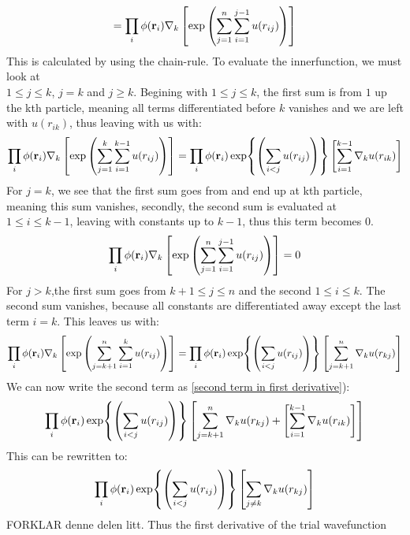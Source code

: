 \documentclass[a4paper, 10pt]{article}
\begin{document}
\begin{appendices}
\begin{align}
  = \prod_{i}\phi(\bold{r}_{i})\nabla_{k}\left[\exp\left(\sum_{j = 1}^{n}\sum_{i = 1}^{j-1}u(r_{ij})\right)\right]
  \label{second term in first derivative}
\end{align}
This is calculated by using the chain-rule. To evaluate the innerfunction, we must look
at \\$1 \le j \le k$, $j = k$ and $j \ge k$. Begining with $1\le  j \le k$,
the first sum is from $1$ up the kth particle, meaning all terms differentiated before $k$ vanishes
and we are left with $u(r_{ik})$, thus leaving with us with:
\begin{align}
  \prod_{i}\phi(\bold{r}_{i})\nabla_{k}\left[\exp\left(\sum_{j = 1}^{k}\sum_{i = 1}^{k-1}u(r_{ij})\right)\right]
  =
  \prod_{i}\phi(\bold{r}_{i})\exp{\left(\sum_{i<j}u(r_{ij})\right)}
  \left[\sum_{i = 1}^{k-1}\nabla_{k}u(r_{ik})\right]
\end{align}
For $j = k$, we see that the first sum goes from and end up at kth particle, meaning
this sum vanishes, secondly, the second sum is evaluated at $1 \le i \le k-1$, leaving with
constants up to $k-1$, thus this term becomes $0$.
\begin{align}
\prod_{i}\phi(\bold{r}_{i})\nabla_{k}\left[\exp\left(\sum_{j = 1}^{n}\sum_{i = 1}^{j-1}u(r_{ij})\right)\right]
= 0
\end{align}
For $j > k$,the first sum goes from $k+1\le j \le n$ and the second $1 \le i \le k$.  The second sum vanishes, because all constants are differentiated away
except the last term $i = k$. This leaves us with:
\begin{align}
  \prod_{i}\phi(\bold{r}_{i})\nabla_{k}\left[\exp\left(\sum_{j = k+1}^{n}\sum_{i = 1}^{k}u(r_{ij})\right)\right]
  = \prod_{i}\phi(\bold{r}_{i})
  \exp{\left(\sum_{i<j}u(r_{ij})\right)}
  \left[\sum_{j = k + 1}^{n}\nabla_{k}u(r_{kj})\right]
\end{align}
We can now write the second term as \ref{second term in first derivative}):
\begin{align}\label{combined sum}
\prod_{i}\phi(\bold{r}_{i})
  \exp{\left(\sum_{i<j}u(r_{ij})\right)}
  \left[\sum_{j = k + 1}^{n}\nabla_{k}u(r_{kj}) +
  \left[\sum_{i = 1}^{k-1}\nabla_{k}u(r_{ik})\right]\right]
\end{align}
This can be rewritten to:
  \begin{align}
  \prod_{i}\phi(\bold{r}_{i})
    \exp{\left(\sum_{i<j}u(r_{ij})\right)}
    \left[\sum_{j \neq k}\nabla_{k}u(r_{kj})\right]
  \end{align}
  FORKLAR denne delen litt. Thus the first derivative of the trial wavefunction

\end{appendices}
\end{document}
